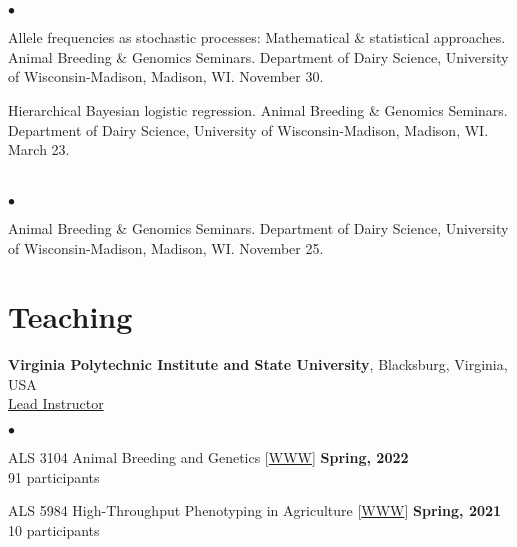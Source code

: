 \documentclass[margin,line,10pt]{res}
\newenvironment{list2}{
  \begin{list}{$\bullet$}{%
      \setlength{\itemsep}{0in}
      \setlength{\parsep}{0in} \setlength{\parskip}{0in}
      \setlength{\topsep}{0in} \setlength{\partopsep}{0in} 
      \setlength{\leftmargin}{0.2in}}}{\end{list}}
\begin{document}
\begin{resume}
\section{}
\begin{list2}
\item Allele frequencies as stochastic processes: Mathematical \& statistical approaches. Animal Breeding \& Genomics Seminars.  Department of Dairy Science, University of Wisconsin-Madison, Madison, WI. November 30.
\vspace{0.5cm}
\item Hierarchical Bayesian logistic regression. Animal Breeding \& Genomics Seminars.  Department of Dairy Science, University of Wisconsin-Madison, Madison, WI. March 23. 
\end{list2}

\section{}
\begin{list2}
\item  Animal Breeding \& Genomics Seminars.  Department of Dairy Science, University of Wisconsin-Madison, Madison, WI. November 25. 
\end{list2}




\vspace{0.5cm}
\section{\sc Teaching}
{\bf Virginia Polytechnic Institute and State University}, Blacksburg, Virginia, USA  \vspace{0.2cm} \\
\underline{Lead Instructor}
\vspace{0.4cm}
\begin{list2}

   \item ALS 3104 Animal Breeding and Genetics [\textcolor{blue}{\href{http://morotalab.org/als3104-2022/ALS3104.html}{WWW}}] 
  \hfill {\bf Spring, 2022} \\
         91  participants 
  
         \vspace{0.5cm}
         

  \item ALS 5984 High-Throughput Phenotyping in Agriculture [\textcolor{blue}{\href{http://morotalab.org/als5984-2021/ALS5984.html}{WWW}}] 
  \hfill {\bf Spring, 2021} \\
         10  participants 
  

\end{list2}
\end{resume}
\end{document}

